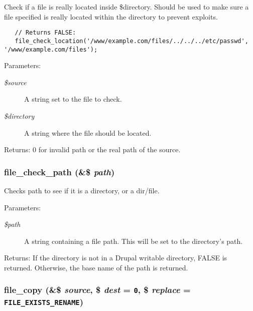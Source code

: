 Check if a file is really located inside \$directory. Should be used to make sure a file specified is really located within the directory to prevent exploits.



\begin{Code}\begin{verbatim}   // Returns FALSE:
   file_check_location('/www/example.com/files/../../../etc/passwd', '/www/example.com/files');
\end{verbatim}
\end{Code}



\begin{Desc}
\item[Parameters:]
\begin{description}
\item[{\em \$source}]A string set to the file to check. \item[{\em \$directory}]A string where the file should be located. \end{description}
\end{Desc}
\begin{Desc}
\item[Returns:]0 for invalid path or the real path of the source. \end{Desc}
\hypertarget{group__file_gf6eee3f0c0c8bc7ebca388ed3032ba66}{
\subsubsection[{file\_\-check\_\-path}]{\setlength{\rightskip}{0pt plus 5cm}file\_\-check\_\-path (\&\$ {\em path})}}
\label{group__file_gf6eee3f0c0c8bc7ebca388ed3032ba66}


Checks path to see if it is a directory, or a dir/file.

\begin{Desc}
\item[Parameters:]
\begin{description}
\item[{\em \$path}]A string containing a file path. This will be set to the directory's path. \end{description}
\end{Desc}
\begin{Desc}
\item[Returns:]If the directory is not in a Drupal writable directory, FALSE is returned. Otherwise, the base name of the path is returned. \end{Desc}
\hypertarget{group__file_g7b8986808579dfb242787b60c8b9838a}{
\subsubsection[{file\_\-copy}]{\setlength{\rightskip}{0pt plus 5cm}file\_\-copy (\&\$ {\em source}, \/  \$ {\em dest} = {\tt 0}, \/  \$ {\em replace} = {\tt FILE\_\-EXISTS\_\-RENAME})}}
\label{group__file_g7b8986808579dfb242787b60c8b9838a}


